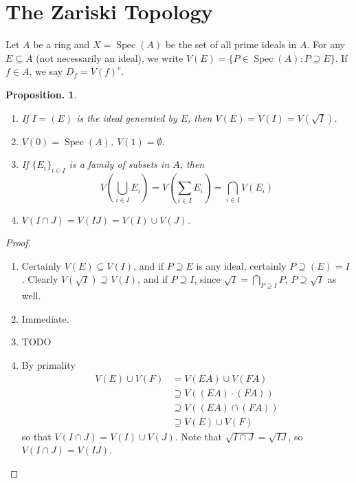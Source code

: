 \documentclass[11pt, a4paper]{memoir}
\theoremstyle{change}
\newtheorem{proposition}[theorem]{Proposition.}
\theoremstyle{plain}
\theoremstyle{nonumberplain}
\newtheorem{proof}{Proof}
\DeclareMathOperator{\Spec}{Spec}
\numberwithin{equation}{section}
\begin{document}
\section{The Zariski Topology}
Let $A$ be a ring and $X=\Spec(A)$ be the set of all prime ideals in $A$.
For any $E\subseteq A$ (not necessarily an ideal), we write $V(E)=\{P\in \Spec(A):P\supseteq E\}$.
If $f\in A$, we say $D_f=V(f)^c$.
\begin{proposition}
    \begin{enumerate}[nl,r]
        \item If $I=(E)$ is the ideal generated by $E$, then $V(E)=V(I)=V(\sqrt{I})$.
        \item $V(0)=\Spec(A)$, $V(1)=\emptyset$.
        \item If $\{E_i\}_{i\in I}$ is a family of subsets in $A$, then
            \begin{equation*}
                V\left(\bigcup_{i\in I}E_i\right)=V\left(\sum_{i\in I}E_i\right)=\bigcap_{i\in I}V(E_i)
            \end{equation*}
        \item $V(I\cap J)=V(IJ)=V(I)\cup V(J)$.
    \end{enumerate}
\end{proposition}
\begin{proof}
    \begin{enumerate}[nl,r]
        \item Certainly $V(E)\subseteq V(I)$, and if $P\supseteq E$ is any ideal, certainly $P\supseteq (E)=I$.
            Clearly $V(\sqrt{I})\supseteq V(I)$, and if $P\supseteq I$, since $\sqrt{I}=\bigcap_{P\supseteq I}P$, $P\supseteq\sqrt{I}$ as well.
        \item Immediate.
        \item TODO
        \item By primality
            \begin{align*}
                V(E)\cup V(F) &= V(EA)\cup V(FA)\\
                              &\supseteq V((EA)\cdot(FA))\\
                              &\supseteq V((EA)\cap(FA))\\
                              &\supseteq V(E)\cup V(F)
            \end{align*}
            so that $V(I\cap J)=V(I)\cup V(J)$.
            Note that $\sqrt{I\cap J}=\sqrt{IJ}$, so $V(I\cap J)=V(IJ)$.
    \end{enumerate}
\end{proof}
\end{document}
